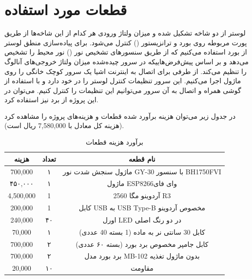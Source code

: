 \documentclass[12pt,a4paper]{article}
\begin{document}
	\section{قطعات مورد استفاده}
	لوستر از دو شاخه  تشکیل شده و میزان ولتاژ ورودی هر کدام از این شاخه‌ها از طریق پورت مربوطه روی بورد  و ترانزیستور () کنترل می‌شود. برای پیاده‌سازی منطق لوستر از بورد  استفاده می‌کنیم که از طریق سنسور‌های تشخیص نور () نور محیط را تشخیص می‌دهد و بر اساس پیش‌فرض‌هاییکه در سرور  چیده‌شده میزان ولتاژ خروجی‌های آنالوگ را تنظیم می‌کند. از طرفی برای اتصال به اینترنت اشیا یک سرور کوچک خانگی را روی ماژول  اجرا می‌کنیم. این سرور تنظیمات کنترل لوستر را در خود دارد و با استفاده از گوشی همراه و اتصال به آن سرور می‌توانیم این تنظیمات را کنترل کنیم. می‌توان در این پروژه از برد  نیز استفاده کرد.
	
	در جدول زیر می‌توان هزینه برآورد شده قطعات و هزینه‌های پروژه را مشاهده کرد (هزینه کل معادل با 7,580,000 ریال است).
	
	\begin{table}[H]
		\centering
		\begin{tabular}{|c|c|c|}
			\hline
			هزینه     & تعداد & نام قطعه                                    \\ \hline
			700,000   & ۱     & ماژول سنجش شدت نور GY-30 با سنسور BH1750FVI \\ \hline
			۴۵۰,۰۰۰   & ۱     & ماژول ESP8266وای فای                        \\ \hline
			4,500,000 & 1     & آردوینو مگا 2560 R3                         \\ \hline
			200,000   & 1     & کابل USB به USB Type-B مخصوص آردوینو        \\ \hline
			240,000   & ۴۰    & اورل LED در دو رنگ اصلی                     \\ \hline
			70,000    & ۱     & کابل 30 سانتی نر به ماده (1  بسته 40 عددی)  \\ \hline
			700,000   & ۲     & کابل جامپر مخصوص برد بورد (بسته ۶۰ عددی)    \\ \hline
			700,000   & ۲     & برد بورد مدل MB-102 بدون ماژول تغذیه        \\ \hline
			20,000    & ۱۰    & مقاومت                                      \\ \hline
		\end{tabular}
		\caption{برآورد هزینه قطعات}
	\end{table}
	
\end{document}

